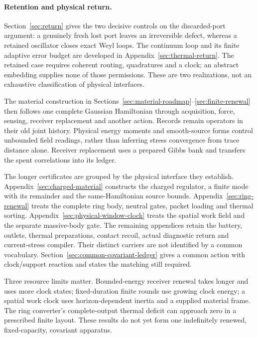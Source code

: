 \paragraph{Retention and physical return.}
Section~\ref{sec:return} gives the two decisive controls on the discarded-port
argument: a genuinely fresh lost port leaves an irreversible defect, whereas
a retained oscillator closes exact Weyl loops. The continuum loop and its
finite adaptive error budget are developed in Appendix~\ref{sec:thermal-return}.
The retained case requires coherent routing, quadratures and a clock; an
abstract embedding supplies none of those permissions.
These are two realizations, not an exhaustive classification of physical
interfaces.

The material construction in Sections~\ref{sec:material-roadmap}--\ref{sec:finite-renewal}
then follows one complete Gaussian Hamiltonian through acquisition, force,
sensing, receiver replacement and another action. Records remain operators
in their old joint history. Physical energy moments and smooth-source forms
control unbounded field readings, rather than inferring stress convergence
from trace distance alone. Receiver replacement uses a prepared Gibbs bank
and transfers the spent correlations into its ledger.

The longer certificates are grouped by the physical interface they establish.
Appendix~\ref{sec:charged-material} constructs the charged regulator, a finite
mode with its remainder and the same-Hamiltonian source bounds.
Appendix~\ref{sec:ring-renewal} treats the complete ring body, neutral gates,
packet loading and thermal sorting. Appendix~\ref{sec:physical-window-clock}
treats the spatial work field and the separate massive-body gate.
The remaining appendices retain the battery, outlets, thermal preparations,
contact recoil, actual diagnostic return and current-stress compiler.
Their distinct carriers are not identified by a common vocabulary.
Section~\ref{sec:common-covariant-ledger} gives a common action with
clock/support reaction and states the matching still required.

Three resource limits matter. Bounded-energy receiver renewal takes longer
and uses more clock states; fixed-duration finite rounds use growing clock
energy; a spatial work clock uses horizon-dependent inertia and a supplied
material frame. The ring converter's complete-output thermal deficit can
approach zero in a prescribed finite layout. These results do not yet form
one indefinitely renewed, fixed-capacity, covariant apparatus.

